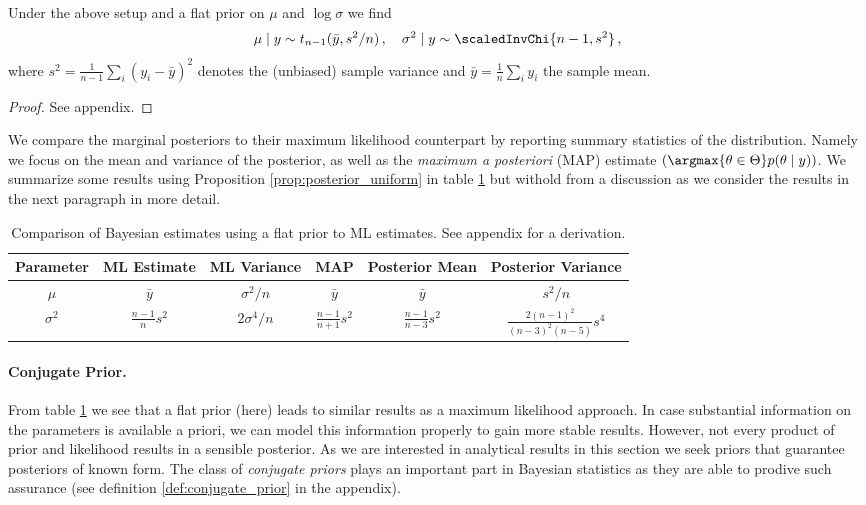 \begin{proposition}\label{prop:posterior_uniform}
  Under the above setup and a flat prior on $\mu$ and $\log \sigma$ we find
  \begin{align*}
    \mu \mid y \sim t_{n-1}(\bar{y}, s^2/n) \,, \quad \sigma^2 \mid y \sim \scaledInvChi{n-1, s^2} \,,
  \end{align*}
  where $s^2 = \frac{1}{n-1} \sum_i (y_i - \bar{y})^2$ denotes the (unbiased) sample variance and $\bar{y} = \frac{1}{n} \sum_i y_i$ the sample mean.
\end{proposition}
\begin{proof}
See appendix.
\end{proof}

We compare the marginal posteriors to their maximum likelihood counterpart by reporting summary statistics of the distribution.
Namely we focus on the mean and variance of the posterior, as well as the \emph{maximum a posteriori} (MAP) estimate $\left(\argmax{\theta \in \Theta} p(\theta \mid y)\right)$.
We summarize some results using Proposition \ref{prop:posterior_uniform} in table \ref{tab:comp_uniform_bay_ml} but withold from a discussion as we consider the results in the next paragraph in more detail.

\begin{table}[ht]
\centering
\def\arraystretch{1.3}
{\small
 \begin{tabular}{c | c c c c c}
 Parameter & ML Estimate & ML Variance & MAP & Posterior Mean & Posterior Variance\\[0.5ex]
 \hline
 $\mu$ & $\bar{y}$ & $\sigma^2/n$ & $\bar{y}$ & $\bar{y}$ & $s^2 / n$\\
 $\sigma^2$ & $\frac{n-1}{n} s^2$ & $2 \sigma^4 /n$ & $\frac{n-1}{n+1} s^2$ & $\frac{n-1}{n-3} s^2$ & $\frac{2 (n-1)^2}{(n-3)^2 (n-5)} s^4$\\
 \end{tabular}
 }
\caption{\small{Comparison of Bayesian estimates using a flat prior to ML estimates. See appendix for a derivation.}}
\label{tab:comp_uniform_bay_ml}
\end{table}

\paragraph{Conjugate Prior.}
From table \ref{tab:comp_uniform_bay_ml} we see that a flat prior (here) leads to similar results as a maximum likelihood approach.
In case substantial information on the parameters is available a priori, we can model this information properly to gain more stable results.
However, not every product of prior and likelihood results in a sensible posterior.
As we are interested in analytical results in this section we seek priors that guarantee posteriors of known form.
The class of \emph{conjugate priors} plays an important part in Bayesian statistics as they are able to prodive such assurance (see definition \ref{def:conjugate_prior} in the appendix).

